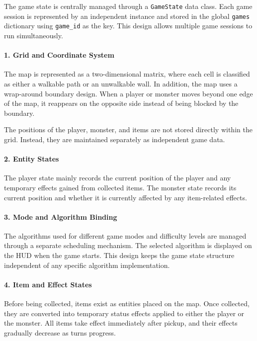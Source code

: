 The game state is centrally managed through a \texttt{GameState} data class. Each game session is represented by an independent instance and stored in the global \texttt{games} dictionary using \texttt{game\_id} as the key. This design allows multiple game sessions to run simultaneously.

\paragraph{1. Grid and Coordinate System}
The map is represented as a two-dimensional matrix, where each cell is classified as either a walkable path or an unwalkable wall. In addition, the map uses a wrap-around boundary design. When a player or monster moves beyond one edge of the map, it reappears on the opposite side instead of being blocked by the boundary.

The positions of the player, monster, and items are not stored directly within the grid. Instead, they are maintained separately as independent game data.

\paragraph{2. Entity States}
The player state mainly records the current position of the player and any temporary effects gained from collected items. The monster state records its current position and whether it is currently affected by any item-related effects.

\paragraph{3. Mode and Algorithm Binding}
The algorithms used for different game modes and difficulty levels are managed through a separate scheduling mechanism. The selected algorithm is displayed on the HUD when the game starts. This design keeps the game state structure independent of any specific algorithm implementation.

\paragraph{4. Item and Effect States}
Before being collected, items exist as entities placed on the map. Once collected, they are converted into temporary status effects applied to either the player or the monster. All items take effect immediately after pickup, and their effects gradually decrease as turns progress.

